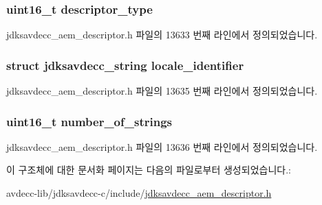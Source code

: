 \subsubsection[{\texorpdfstring{descriptor\+\_\+type}{descriptor_type}}]{\setlength{\rightskip}{0pt plus 5cm}uint16\+\_\+t descriptor\+\_\+type}\hypertarget{structjdksavdecc__descriptor__locale_ab7c32b6c7131c13d4ea3b7ee2f09b78d}{}\label{structjdksavdecc__descriptor__locale_ab7c32b6c7131c13d4ea3b7ee2f09b78d}


jdksavdecc\+\_\+aem\+\_\+descriptor.\+h 파일의 13633 번째 라인에서 정의되었습니다.

\subsubsection[{\texorpdfstring{locale\+\_\+identifier}{locale_identifier}}]{\setlength{\rightskip}{0pt plus 5cm}struct {\bf jdksavdecc\+\_\+string} locale\+\_\+identifier}\hypertarget{structjdksavdecc__descriptor__locale_a9bb3899edf7af17fb64933e1c3ad4f16}{}\label{structjdksavdecc__descriptor__locale_a9bb3899edf7af17fb64933e1c3ad4f16}


jdksavdecc\+\_\+aem\+\_\+descriptor.\+h 파일의 13635 번째 라인에서 정의되었습니다.

\subsubsection[{\texorpdfstring{number\+\_\+of\+\_\+strings}{number_of_strings}}]{\setlength{\rightskip}{0pt plus 5cm}uint16\+\_\+t number\+\_\+of\+\_\+strings}\hypertarget{structjdksavdecc__descriptor__locale_a254c618149fe64f05a5e4ead8d5f046d}{}\label{structjdksavdecc__descriptor__locale_a254c618149fe64f05a5e4ead8d5f046d}


jdksavdecc\+\_\+aem\+\_\+descriptor.\+h 파일의 13636 번째 라인에서 정의되었습니다.



이 구조체에 대한 문서화 페이지는 다음의 파일로부터 생성되었습니다.\+:\begin{DoxyCompactItemize}
\item 
avdecc-\/lib/jdksavdecc-\/c/include/\hyperlink{jdksavdecc__aem__descriptor_8h}{jdksavdecc\+\_\+aem\+\_\+descriptor.\+h}\end{DoxyCompactItemize}
